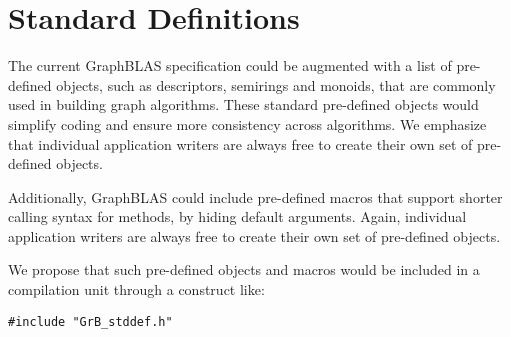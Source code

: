 \section{Standard Definitions}
\label{Sec:stddef}

The current GraphBLAS specification could be augmented with a list of 
pre-defined objects, such as descriptors, semirings and monoids, that are commonly used
in building graph algorithms. These standard pre-defined objects would
simplify coding and ensure more consistency across algorithms. 
We emphasize
that individual application writers are always free to create their own set of
pre-defined objects.

Additionally, GraphBLAS could include pre-defined macros that support
shorter calling syntax for methods, by hiding default arguments. 
Again, individual application writers are always free to create their
own set of pre-defined objects.

We propose that such pre-defined objects and macros would
be included in a compilation unit through a construct like:

\begin{verbatim}
#include "GrB_stddef.h"
\end{verbatim}